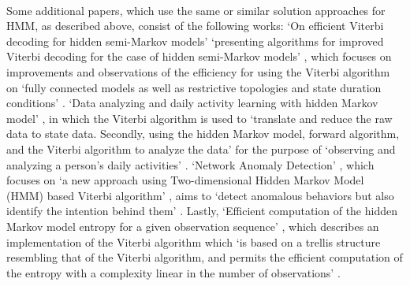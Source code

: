 \documentclass[12pt,journal,compsoc]{IEEEtran}
\begin{document}
\\
Some additional papers, which use the same or similar solution approaches for HMM, as described above, consist of the following works: ‘On efficient Viterbi decoding for hidden semi-Markov models’ \cite{article:viterbiEfficiency} ‘presenting algorithms for improved Viterbi decoding for the case of hidden semi-Markov models’ \cite{article:viterbiEfficiency}, which focuses on improvements and observations of the efficiency for using the Viterbi algorithm on ‘fully connected models as well as restrictive topologies and state duration conditions’ \cite{article:viterbiEfficiency}. ‘Data analyzing and daily activity learning with hidden Markov model’ \cite{article:dataAnalyzing}, in which the Viterbi algorithm is used to ‘translate and reduce the raw data to state data. Secondly, using the hidden Markov model, forward algorithm, and the Viterbi algorithm to analyze the data’ \cite{article:dataAnalyzing} for the purpose of ‘observing and analyzing a person’s daily activities’ \cite{article:dataAnalyzing}. ‘Network Anomaly Detection’ \cite{article:networkAnomaly}, which focuses on ‘a new approach using Two-dimensional Hidden Markov Model (HMM) based Viterbi algorithm’ \cite{article:networkAnomaly}, aims to ‘detect anomalous behaviors but also identify the intention behind them’ \cite{article:networkAnomaly}. Lastly, ‘Efficient computation of the hidden Markov model entropy for a given observation sequence’ \cite{article:efficientComputation}, which describes an implementation of the Viterbi algorithm which ‘is based on a trellis structure resembling that of the Viterbi algorithm, and permits the efficient computation of the entropy with a complexity linear in the number of observations’ \cite{article:efficientComputation}.
\end{document}
